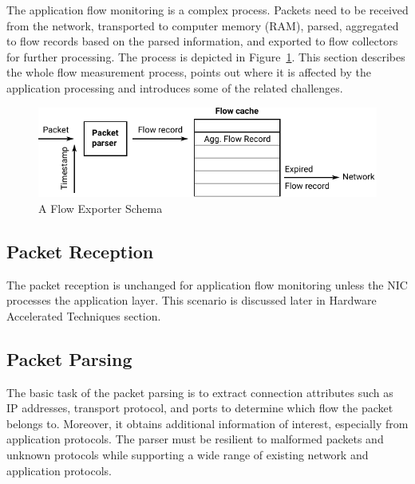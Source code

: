 

The application flow monitoring is a complex process. Packets need to be received from the network, transported to computer memory (RAM), parsed, aggregated to flow records based on the parsed information, and exported to flow collectors for further processing. The process is depicted in Figure~\ref{fig:flow-exporter-schema}. This section describes the whole flow measurement process, points out where it is affected by the application processing and introduces some of the related challenges.

\begin{figure}[tb!]
  \begin{center}
    \includegraphics[width=\textwidth]{figures/flow-exporter-schema}
  \end{center}
  \caption{A Flow Exporter Schema}
  \label{fig:flow-exporter-schema}
\end{figure}

\subsection{Packet Reception}

The packet reception is unchanged for application flow monitoring unless the NIC processes the application layer. This scenario is discussed later in Hardware Accelerated Techniques section.


\subsection{Packet Parsing}

The basic task of the packet parsing is to extract connection attributes such as IP addresses, transport protocol, and ports to determine which flow the packet belongs to. Moreover, it obtains additional information of interest, especially from application protocols. The parser must be resilient to malformed packets and unknown protocols while supporting a wide range of existing network and application protocols.

